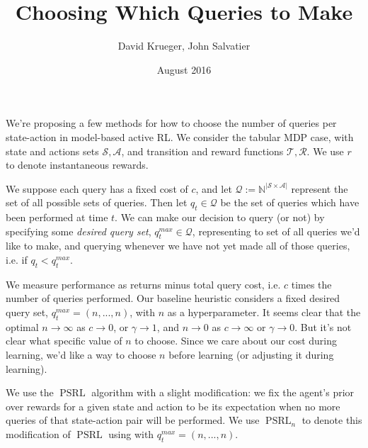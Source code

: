 \documentclass{article}
\title{Choosing Which Queries to Make}
\author{David Krueger, John Salvatier}
\date{August 2016}
\begin{document}
\maketitle





We're proposing a few methods for how to choose the number of queries per state-action in model-based active RL.
We consider the tabular MDP case, with state and actions sets $\mathcal{S}, \mathcal{A}$, and transition and reward functions $\mathcal{T}, \mathcal{R}$.
We use $r$ to denote instantaneous rewards.

We suppose each query has a fixed cost of $c$, and let $\mathcal{Q} := \mathbb{N}^{| \mathcal{S} \times \mathcal{A} |}$ represent the set of all possible sets of queries.
Then let $q_t \in \mathcal{Q}$ be the set of queries which have been performed at time $t$.
We can make our decision to query (or not) by specifying some \emph{desired query set}, $q^{max}_t \in \mathcal{Q}$, representing to set of all queries we'd like to make, and querying whenever we have not yet made all of those queries, i.e. if $q_t < q^{max}_t$.

We measure performance as returns minus total query cost, i.e. $c$ times the number of queries performed.
Our baseline heuristic considers a fixed desired query set, $q^{max}_t = (n,...,n)$, with $n$ as a hyperparameter.
It seems clear that the optimal $n \rightarrow \infty$ as $c \rightarrow 0$, or $\gamma \rightarrow 1$, and $n \rightarrow 0$ as $c \rightarrow \infty$ or $\gamma \rightarrow 0$.
But it's not clear what specific value of $n$ to choose.
Since we care about our cost during learning, we'd like a way to choose $n$ before learning (or adjusting it during learning).

We use the $\mathop{PSRL}$ algorithm with a slight modification: we fix the agent's prior over rewards for a given state and action to be its expectation when no more queries of that state-action pair will be performed.
We use $\mathop{PSRL}_n$ to denote this modification of $\mathop{PSRL}$ using with $q^{max}_t = (n,...,n)$.





\end{document}
